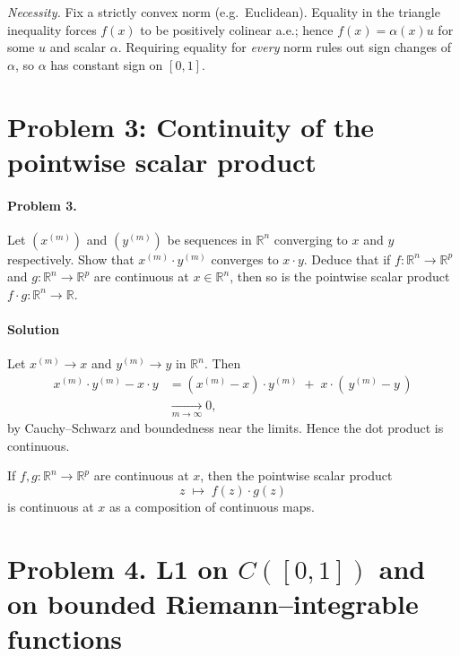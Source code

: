 \documentclass[12pt,a4paper]{article}
\theoremstyle{plain}
\theoremstyle{definition}
\theoremstyle{remark}
\theoremstyle{remark}
\begin{document}
\noindent\textit{Necessity.}
Fix a strictly convex norm (e.g.\ Euclidean). Equality in the triangle inequality forces
$f(x)$ to be positively colinear a.e.; hence $f(x)=\alpha(x)u$ for some $u$ and scalar $\alpha$.
Requiring equality for \emph{every} norm rules out sign changes of $\alpha$, so $\alpha$ has
constant sign on $[0,1]$.
\medskip

\section*{Problem 3: Continuity of the pointwise scalar product}



\paragraph{Problem 3.}

Let $(x^{(m)})$ and $(y^{(m)})$ be sequences in $\mathbb{R}^n$ converging to $x$ and $y$ respectively.
Show that $x^{(m)}\cdot y^{(m)}$ converges to $x\cdot y$. Deduce that if
$f:\mathbb{R}^n\to\mathbb{R}^p$ and $g:\mathbb{R}^n\to\mathbb{R}^p$ are continuous at
$x\in\mathbb{R}^n$, then so is the pointwise scalar product
$f\cdot g:\mathbb{R}^n\to\mathbb{R}$.

\paragraph{Solution}

Let $x^{(m)}\to x$ and $y^{(m)}\to y$ in $\mathbb{R}^n$. Then
\begin{align*}
	x^{(m)}\!\cdot y^{(m)} - x\!\cdot y
	&= (x^{(m)}-x)\!\cdot y^{(m)} \;+\; x\!\cdot (\,y^{(m)}-y\,) \\
	&\xrightarrow[m\to\infty]{} 0,
\end{align*}
by Cauchy--Schwarz and boundedness near the limits. Hence the dot product is continuous.

If $f,g:\mathbb{R}^n\to\mathbb{R}^p$ are continuous at $x$, then the pointwise scalar product
\[
z \;\longmapsto\; f(z)\cdot g(z)
\]
is continuous at $x$ as a composition of continuous maps.
	


\section*{Problem 4. {L1} on $C([0,1])$ and on bounded Riemann–integrable functions}
\end{document}
